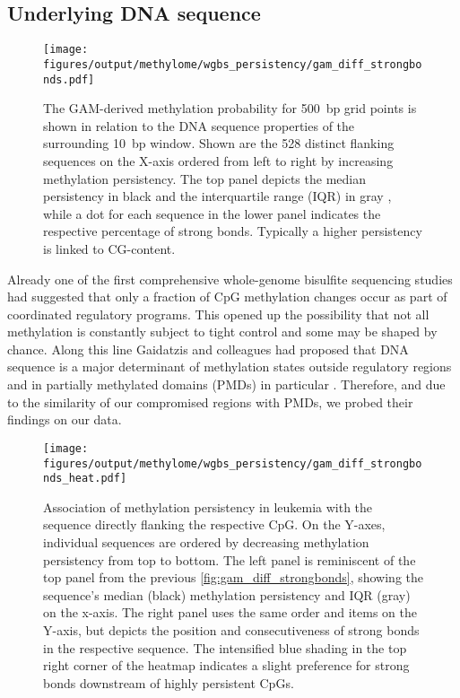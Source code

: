 \subsection{Underlying DNA sequence}
\label{chap:r:persistency:sequence}

\begin{figure}[!ht]
	\centering
	\texttt{[image: figures/output/methylome/wgbs\_persistency/gam\_diff\_strongbonds.pdf]}
	\caption{The GAM-derived methylation probability for \SI{500}{bp} grid points is shown in relation to the DNA sequence properties of the surrounding \SI{10}{bp} window. Shown are the \num{528} distinct flanking sequences on the X-axis ordered from left to right by increasing methylation persistency. The top panel depicts the median persistency in black and the interquartile range (IQR) in gray , while a dot for each sequence in the lower panel indicates the respective percentage of strong bonds. Typically a higher persistency is linked to CG-content.}
	\label{fig:gam_diff_strongbonds}
\end{figure}

Already one of the first comprehensive whole-genome bisulfite sequencing studies had suggested that only a fraction of CpG methylation changes occur as part of coordinated regulatory programs\cite{Ziller2013}. This opened up the possibility that not all methylation is constantly subject to tight control and some may be shaped by chance. Along this line Gaidatzis and colleagues had proposed that DNA sequence is a major determinant of methylation states outside regulatory regions and in partially methylated domains (PMDs) in particular \cite{Gaidatzis2014}. Therefore, and due to the similarity of our compromised regions  with PMDs, we probed their findings on our data. 

\begin{figure}[!ht]
	\centering
	\texttt{[image: figures/output/methylome/wgbs\_persistency/gam\_diff\_strongbonds\_heat.pdf]}
	\caption{Association of methylation persistency in \dnmtchip leukemia with the sequence directly flanking the respective CpG. On the Y-axes, individual sequences are ordered by decreasing methylation persistency from top to bottom. The left panel is reminiscent of the top panel from the previous \autoref{fig:gam_diff_strongbonds}, showing the sequence's median (black) methylation persistency and IQR (gray) on the x-axis. The right panel uses the same order and items on the Y-axis, but depicts the position and consecutiveness of strong bonds in the respective sequence. The intensified blue shading in the top right corner of the heatmap indicates a slight preference for strong bonds downstream of highly persistent CpGs.}
	\label{fig:gam_diff_strongbonds_heat}
\end{figure}

